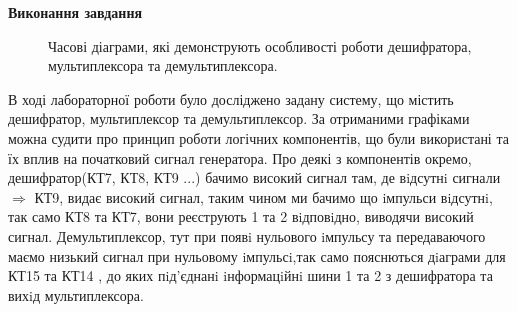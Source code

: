 \documentclass[a4paper,14pt]{extreport}
\begin{document}
\begin{center}
\textbf{Виконання завдання}
\end{center}
 \begin{figure}[h!]
	\caption{Часові діаграми, які демонструють особливості роботи дешифратора, мультиплексора та демультиплексора.}
	\label{ris2}
\end{figure}

\clearpage 
\newpage
\begin{center}
\textbf{}
\end{center}

В ході лабораторної роботи було досліджено задану систему, що містить дешифратор, мультиплексор та демультиплексор. За отриманими графіками
можна судити про принцип роботи логічних компонентів, що були використані та їх вплив на початковий сигнал генератора. Про деякі з компонентів окремо, дешифратор(КТ7, КТ8, КТ9 ...) бачимо високий сигнал там, де вiдсутнi  сигнали $\Rightarrow$ КТ9, видає високий сигнал, таким чином ми бачимо що iмпульси вiдсутнi, так само КТ8 та КТ7, вони реєструють 1 та 2 вiдповiдно, виводячи високий сигнал. Демультиплексор, тут при появi нульового iмпульсу та передаваючого  маємо низький сигнал при нульовому iмпульсi,так само пояснються дiаграми для КТ15 та КТ14 , до яких пiд’єднанi iнформацiйнi шини 1 та 2 з дешифратора та вихiд мультиплексора. 
\end{document}

